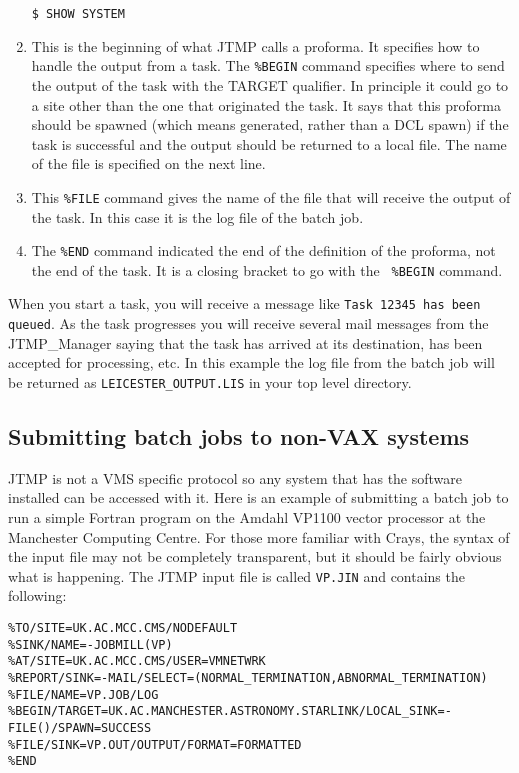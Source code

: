 \begin{enumerate}
\begin{verbatim}
$ SHOW SYSTEM
\end{verbatim}

\item This is the beginning of what JTMP calls a proforma. It specifies how to
handle the output from a task. The {\tt \%BEGIN} command specifies where to
send the output of the task with the TARGET qualifier. In principle it could go
to a site other than the one that originated the task. It says that this
proforma should be spawned (which means generated, rather than a DCL spawn) if
the task is successful and the output should be returned to a local file. The
name of the file is specified on the next line.

\item This {\tt \%FILE} command gives the name of the file that will receive the
output of the task. In this case it is the log file of the batch job.

\item The {\tt \%END} command indicated the end of the definition of the
proforma, not the end of the task. It is a closing bracket to go with the {\tt
\%BEGIN} command.

\end{enumerate}

When you start a task, you will receive a message like {\tt Task 12345 has been
queued}. As the task progresses you will receive several mail messages from the
JTMP\_Manager saying that the task has arrived at its destination, has been
accepted for processing, etc. In this example the log file from the batch job
will be returned as {\tt LEICESTER\_OUTPUT.LIS} in your top level directory.

\subsection{Submitting batch jobs to non-VAX systems}

JTMP is not a VMS specific protocol so any system that has the software
installed can be accessed with it. Here is an example of submitting a batch job
to run a simple Fortran program on the Amdahl VP1100 vector processor at the
Manchester Computing Centre. For those more familiar with Crays, the syntax of
the input file may not be completely transparent, but it should be fairly
obvious what is happening. The JTMP input file is called {\tt VP.JIN} and
contains the following:

\begin{verbatim}
%TO/SITE=UK.AC.MCC.CMS/NODEFAULT
%SINK/NAME=-JOBMILL(VP)
%AT/SITE=UK.AC.MCC.CMS/USER=VMNETWRK
%REPORT/SINK=-MAIL/SELECT=(NORMAL_TERMINATION,ABNORMAL_TERMINATION)
%FILE/NAME=VP.JOB/LOG
%BEGIN/TARGET=UK.AC.MANCHESTER.ASTRONOMY.STARLINK/LOCAL_SINK=-FILE()/SPAWN=SUCCESS
%FILE/SINK=VP.OUT/OUTPUT/FORMAT=FORMATTED
%END
\end{verbatim}

